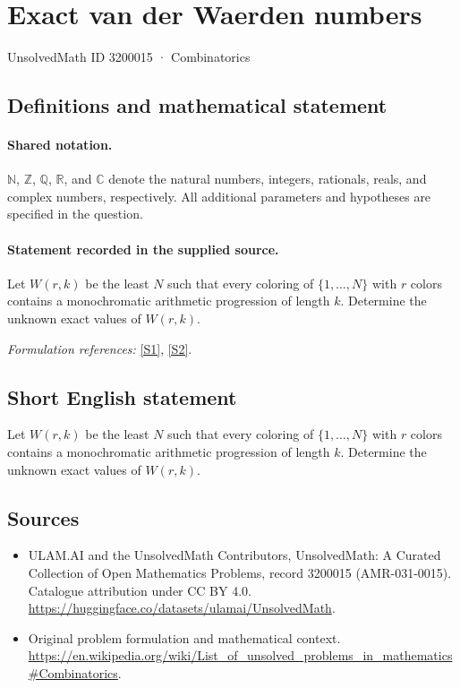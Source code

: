 \documentclass[11pt]{article}
\newcommand{\sref}[2]{\hyperlink{source:#1:#2}{[S#2]}}
\begin{document}
\setcounter{section}{3200014}
\section{Exact van der Waerden numbers}\label{3200015}
{\small UnsolvedMath ID 3200015 · Combinatorics}
\subsection{Definitions and mathematical statement}

\paragraph{Shared notation.}$\mathbb N$, $\mathbb Z$, $\mathbb Q$, $\mathbb R$, and $\mathbb C$ denote the natural numbers, integers, rationals, reals, and complex numbers, respectively. All additional parameters and hypotheses are specified in the question.


\paragraph{Statement recorded in the supplied source.}
Let $W(r,k)$ be the least $N$ such that every coloring of $\{1,\ldots,N\}$ with $r$ colors contains a monochromatic arithmetic progression of length $k$. Determine the unknown exact values of $W(r,k)$.
\par\smallskip\textit{Formulation references:} \sref{3200015}{1}, \sref{3200015}{2}.
\subsection{Short English statement}
Let $W(r,k)$ be the least $N$ such that every coloring of $\{1,\ldots,N\}$ with $r$ colors contains a monochromatic arithmetic progression of length $k$. Determine the unknown exact values of $W(r,k)$.
\subsection{Sources}
\begin{itemize}
\item[\hypertarget{source:3200015:1}{S1}] ULAM.AI and the UnsolvedMath Contributors, UnsolvedMath: A Curated Collection of Open Mathematics Problems, record 3200015 (AMR-031-0015). Catalogue attribution under CC BY 4.0.
\url{https://huggingface.co/datasets/ulamai/UnsolvedMath}.
\item[\hypertarget{source:3200015:2}{S2}] Original problem formulation and mathematical context.
\url{https://en.wikipedia.org/wiki/List_of_unsolved_problems_in_mathematics#Combinatorics}.
\end{itemize}
\label{end:3200015}
\end{document}
